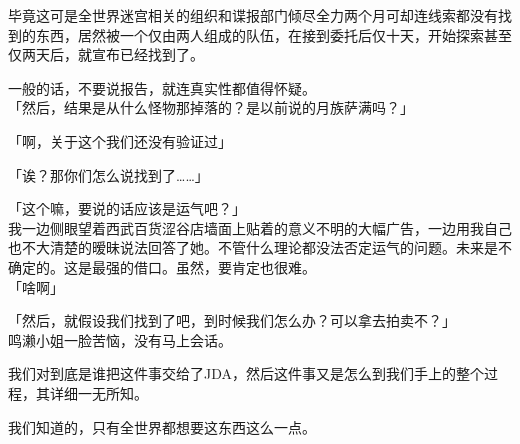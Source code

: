 毕竟这可是全世界迷宫相关的组织和谍报部门倾尽全力两个月可却连线索都没有找到的东西，居然被一个仅由两人组成的队伍，在接到委托后仅十天，开始探索甚至仅两天后，就宣布已经找到了。

一般的话，不要说报告，就连真实性都值得怀疑。\\

「然后，结果是从什么怪物那掉落的？是以前说的月族萨满吗？」

「啊，关于这个我们还没有验证过」

「诶？那你们怎么说找到了……」

「这个嘛，要说的话应该是运气吧？」\\

我一边侧眼望着西武百货涩谷店墙面上贴着的意义不明的大幅广告，一边用我自己也不大清楚的暧昧说法回答了她。不管什么理论都没法否定运气的问题。未来是不确定的。这是最强的借口。虽然，要肯定也很难。\\

「啥啊」

「然后，就假设我们找到了吧，到时候我们怎么办？可以拿去拍卖不？」\\

鸣濑小姐一脸苦恼，没有马上会话。

我们对到底是谁把这件事交给了JDA，然后这件事又是怎么到我们手上的整个过程，其详细一无所知。

我们知道的，只有全世界都想要这东西这么一点。\\

